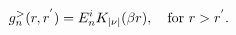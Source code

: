 \begin{equation}
g^{>}_{n}(r,r^{'})=E_n^{i}K_{|\nu|}(\beta r), 
\quad \hbox{for $r>r^{'}$.}
\label{18} 
\end{equation}

